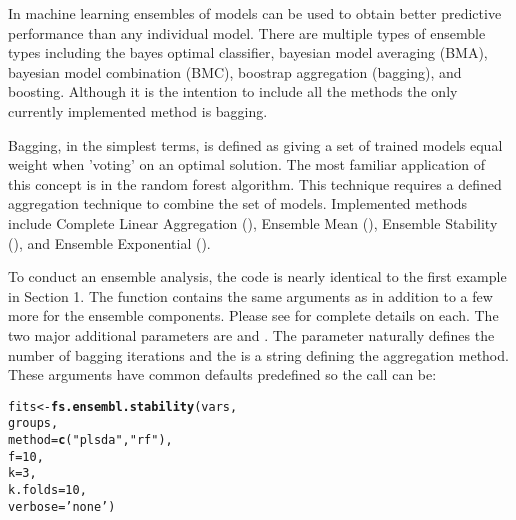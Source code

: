 \documentclass[12pt]{article}\usepackage[]{graphicx}\usepackage[usenames,dvipsnames]{color}
\makeatletter
\newcommand{\hlnum}[1]{\textcolor[rgb]{0.686,0.059,0.569}{#1}}%
\newcommand{\hlstr}[1]{\textcolor[rgb]{0.192,0.494,0.8}{#1}}%
\newcommand{\hlstd}[1]{\textcolor[rgb]{0.345,0.345,0.345}{#1}}%
\newcommand{\hlkwb}[1]{\textcolor[rgb]{0.69,0.353,0.396}{#1}}%
\newcommand{\hlkwc}[1]{\textcolor[rgb]{0.333,0.667,0.333}{#1}}%
\newcommand{\hlkwd}[1]{\textcolor[rgb]{0.737,0.353,0.396}{\textbf{#1}}}%
\newenvironment{kframe}{%
 \def\at@end@of@kframe{}%
 \ifinner\ifhmode%
  \def\at@end@of@kframe{\end{minipage}}%
  \begin{minipage}{\columnwidth}%
 \fi\fi%
 \def\FrameCommand##1{\hskip\@totalleftmargin \hskip-\fboxsep
 \colorbox{shadecolor}{##1}\hskip-\fboxsep
     \hskip-\linewidth \hskip-\@totalleftmargin \hskip\columnwidth}%
 \MakeFramed {\advance\hsize-\width
   \@totalleftmargin\z@ \linewidth\hsize
   \@setminipage}}%
 {\par\unskip\endMakeFramed%
 \at@end@of@kframe}
\newenvironment{knitrout}{}{} %
\makeatother
\begin{document}
In machine learning ensembles of models can be used to obtain better predictive
performance than any individual model.  There are multiple types of ensemble
types including the bayes optimal classifier, bayesian model averaging (BMA),
bayesian model combination (BMC), boostrap aggregation (bagging), and boosting. 
Although it is the intention to include all the methods the only currently
implemented method is bagging.

Bagging, in the simplest terms, is defined as giving a set of trained models
equal weight when 'voting' on an optimal solution.  The most familiar 
application of this concept is in the random forest algorithm.  This technique
requires a defined aggregation technique to combine the set of models.  
Implemented methods include Complete Linear Aggregation (), 
Ensemble Mean (), Ensemble Stability (), and
Ensemble Exponential ().

To conduct an ensemble analysis, the code is nearly identical to the first
example in Section 1.  The  function contains
the same arguments as  in addition to a few more for
the ensemble components.  Please see  for
complete details on each.  The two major additional parameters are 
 and .  The  parameter
naturally defines the number of bagging iterations and the 
 is a string defining the aggregation method.  These
arguments have common defaults predefined so the call can be:

\begin{knitrout}
\color{fgcolor}\begin{kframe}
\begin{alltt}
\hlstd{fits} \hlkwb{<-} \hlkwd{fs.ensembl.stability}\hlstd{(vars,}
                            \hlstd{groups,}
                            \hlkwc{method} \hlstd{=} \hlkwd{c}\hlstd{(}\hlstr{"plsda"}\hlstd{,} \hlstr{"rf"}\hlstd{),}
                            \hlkwc{f} \hlstd{=} \hlnum{10}\hlstd{,}
                            \hlkwc{k} \hlstd{=} \hlnum{3}\hlstd{,}
                            \hlkwc{k.folds} \hlstd{=} \hlnum{10}\hlstd{,}
                            \hlkwc{verbose} \hlstd{=} \hlstr{'none'}\hlstd{)}
\end{alltt}
\end{kframe}
\end{knitrout}
\end{document}
